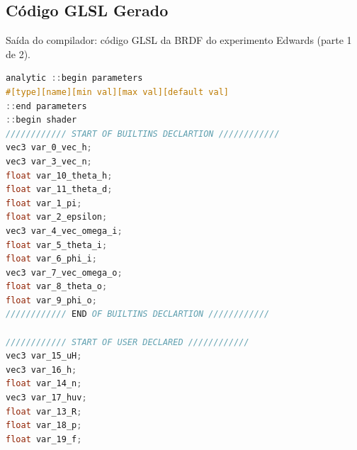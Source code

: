 \subsection{Código GLSL Gerado}
\begin{codigo}[H]
    \caption{\small Saída do compilador: código GLSL da BRDF do experimento Edwards (parte 1 de 2).}
    \label{cod-edwards-2006-glsl-pt-1}
\begin{lstlisting}[language=C, inputencoding=utf8]
analytic ::begin parameters
#[type][name][min val][max val][default val]
::end parameters
::begin shader
//////////// START OF BUILTINS DECLARTION ////////////
vec3 var_0_vec_h;
vec3 var_3_vec_n;
float var_10_theta_h;
float var_11_theta_d;
float var_1_pi;
float var_2_epsilon;
vec3 var_4_vec_omega_i;
float var_5_theta_i;
float var_6_phi_i;
vec3 var_7_vec_omega_o;
float var_8_theta_o;
float var_9_phi_o;
//////////// END OF BUILTINS DECLARTION ////////////

//////////// START OF USER DECLARED ////////////
vec3 var_15_uH;
vec3 var_16_h;
float var_14_n;
vec3 var_17_huv;
float var_13_R;
float var_18_p;
float var_19_f;
\end{lstlisting}
\end{codigo}

